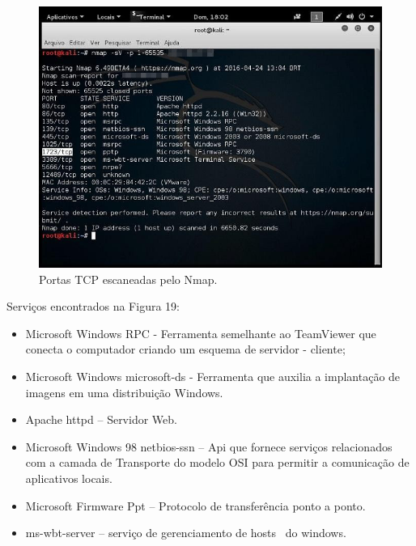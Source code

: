 \documentclass[
    12pt,               %
    openright,          %
    oneside,            %
    a4paper,            %
    section=TITLE,     %
    english,            %
    french,             %
    spanish,            %
    brazil              %
    ]{abntex2}
\begin{document}
\begin{figure}[htp]
\centering
\caption{Portas TCP escaneadas pelo Nmap.}
\includegraphics[width=450px]{image15.jpeg}
\end{figure}
\ifdefined\FloatBarrier \FloatBarrier \fi


Serviços encontrados na Figura 19:



\begin{itemize}
	
\item Microsoft Windows RPC - Ferramenta semelhante ao TeamViewer que conecta o computador criando um esquema de servidor - cliente;
	
\item Microsoft Windows microsoft-ds - Ferramenta que auxilia a implantação de imagens em uma distribuição Windows.
	
\item Apache httpd -- Servidor Web.
	
\item Microsoft Windows 98 netbios-ssn -- Api que fornece serviços relacionados com a camada de Transporte do modelo OSI para permitir a comunicação de aplicativos locais.
	
\item Microsoft Firmware Ppt -- Protocolo de transferência ponto a ponto.
	
\item ms-wbt-server -- serviço de gerenciamento de hosts~ do windows.

\end{itemize}


\end{document}
